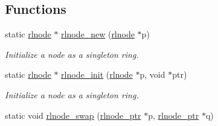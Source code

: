 \subsection*{Functions}
\begin{DoxyCompactItemize}
\item 
static \hyperlink{group__rlists_ga8f6244877f7ce2322c90525217ea6e7a}{rlnode} $\ast$ \hyperlink{group__rlists_gaccdb4bce65952fede472de20297eb36e}{rlnode\-\_\-new} (\hyperlink{group__rlists_ga8f6244877f7ce2322c90525217ea6e7a}{rlnode} $\ast$p)
\begin{DoxyCompactList}\small\item\em Initialize a node as a singleton ring. \end{DoxyCompactList}\item 
static \hyperlink{group__rlists_ga8f6244877f7ce2322c90525217ea6e7a}{rlnode} $\ast$ \hyperlink{group__rlists_ga578e6dc256d4f1580bd8500edf374aca}{rlnode\-\_\-init} (\hyperlink{group__rlists_ga8f6244877f7ce2322c90525217ea6e7a}{rlnode} $\ast$p, void $\ast$ptr)
\begin{DoxyCompactList}\small\item\em Initialize a node as a singleton ring. \end{DoxyCompactList}\item 
\hypertarget{group__rlists_ga47c4de39ce6c032dd9fc23c88a883a4b}{static void \hyperlink{group__rlists_ga47c4de39ce6c032dd9fc23c88a883a4b}{rlnode\-\_\-swap} (\hyperlink{group__rlists_gaae2ea9be18d20f0c80a62a2f8e2eed4d}{rlnode\-\_\-ptr} $\ast$p, \hyperlink{group__rlists_gaae2ea9be18d20f0c80a62a2f8e2eed4d}{rlnode\-\_\-ptr} $\ast$q)}\label{group__rlists_ga47c4de39ce6c032dd9fc23c88a883a4b}


\end{DoxyCompactItemize}
